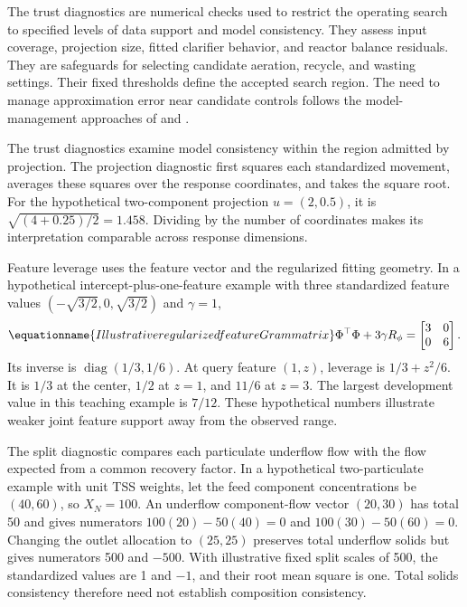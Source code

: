 The trust diagnostics are numerical checks used to restrict the operating search to specified levels of data support and model consistency. They assess input coverage, projection size, fitted clarifier behavior, and reactor balance residuals. They are safeguards for selecting candidate aeration, recycle, and wasting settings. Their fixed thresholds define the accepted search region. The need to manage approximation error near candidate controls follows the model-management approaches of \citet{Alexandrov1998} and \citet{Hameed2026}.

The trust diagnostics examine model consistency within the region admitted by projection. The projection diagnostic first squares each standardized movement, averages these squares over the response coordinates, and takes the square root. For the hypothetical two-component projection $u=(2,0.5)$, it is $\sqrt{(4+0.25)/2}=1.458$. Dividing by the number of coordinates makes its interpretation comparable across response dimensions.

Feature leverage uses the feature vector and the regularized fitting geometry. In a hypothetical intercept-plus-one-feature example with three standardized feature values $(-\sqrt{3/2},0,\sqrt{3/2})$ and $\gamma=1$,
\begin{equation}
\equationname{Illustrative regularized feature Gram matrix}
\Phi^\top\Phi+3\gamma R_\phi=
\begin{bmatrix}3&0\\0&6\end{bmatrix}.
\end{equation}
Its inverse is $\operatorname{diag}(1/3,1/6)$. At query feature $(1,z)$, leverage is $1/3+z^2/6$. It is $1/3$ at the center, $1/2$ at $z=1$, and $11/6$ at $z=3$. The largest development value in this teaching example is $7/12$. These hypothetical numbers illustrate weaker joint feature support away from the observed range.

The split diagnostic compares each particulate underflow flow with the flow expected from a common recovery factor. In a hypothetical two-particulate example with unit TSS weights, let the feed component concentrations be $(40,60)$, so $X_N=100$. An underflow component-flow vector $(20,30)$ has total 50 and gives numerators $100(20)-50(40)=0$ and $100(30)-50(60)=0$. Changing the outlet allocation to $(25,25)$ preserves total underflow solids but gives numerators 500 and $-500$. With illustrative fixed split scales of 500, the standardized values are 1 and $-1$, and their root mean square is one. Total solids consistency therefore need not establish composition consistency.


